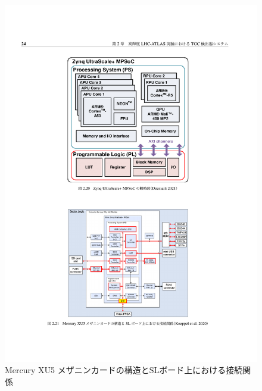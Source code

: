 \begin{figure} 
\centering
\includegraphics[width=16cm]{fig/Intro/SL_mezanin.pdf}
\caption[Mercury XU5 メザニンカードの構造とSLボード上における接続関係]{Mercury XU5 メザニンカードの構造とSLボード上における接続関係\cite{mt_mishima}}
\label{SL_mezanin}
\end{figure}